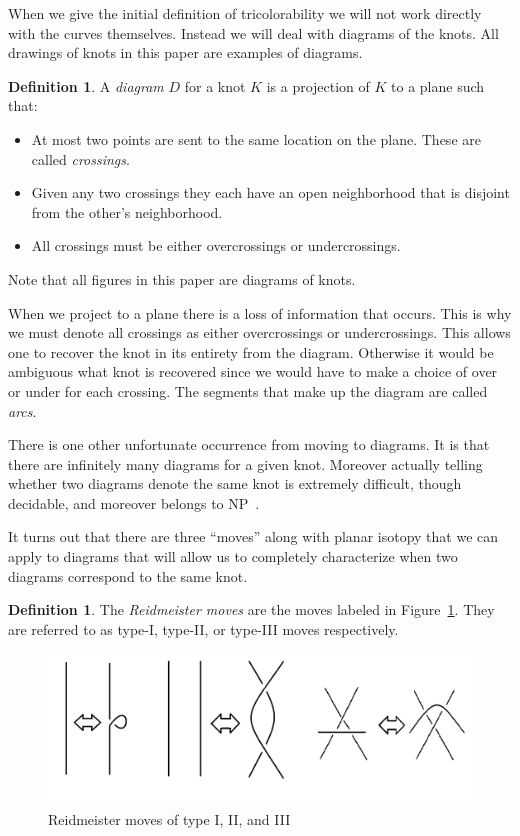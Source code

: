 \documentclass[12pt]{amsart}
\theoremstyle{definition}
\newtheorem{definition}[theorem]{Definition}
\theoremstyle{remark}
\numberwithin{equation}{section}
\newcommand{\ds}{.3}
\begin{document}
When we give the initial definition of  tricolorability we will not work
directly with the curves themselves. Instead we will deal with diagrams
of the knots. All drawings of knots in this paper are examples of diagrams.

\begin{definition}
  A \textit{diagram} $D$ for a knot $K$ is a projection of $K$ to a plane
  such that:
  \begin{itemize}
  \item At most two points are sent to the same location on the plane.
    These are called \textit{crossings}.
  \item Given any two crossings they each have an open neighborhood
    that is disjoint from the other's neighborhood.
  \item All crossings must be either overcrossings or undercrossings.
  \end{itemize}
  Note that all figures in this paper are diagrams of knots.
\end{definition}

When we project to a plane there is a loss of information that occurs. This
is why we must denote all crossings as either overcrossings or undercrossings.
This allows one to recover the knot in its entirety from the diagram. Otherwise
it would be ambiguous what knot is recovered since we would have to make a choice
of over or under for each crossing. The segments that make up the diagram
are called \textit{arcs}.

There is one other unfortunate occurrence
from moving to diagrams. It is that there are infinitely many diagrams
for a given knot. Moreover actually telling whether two diagrams denote
the same knot is extremely difficult, though decidable, and moreover
belongs to NP~\cite{Poonen}.

It turns out that there are three ``moves'' along with planar isotopy
that we can apply to diagrams that will allow us to completely characterize
when two diagrams correspond to the same knot.

\begin{definition}
  The \textit{Reidmeister moves} are the moves labeled in Figure~\ref{fig:reidmeister}.
  They are referred to as type-I, type-II, or type-III moves respectively.

  \begin{figure}
    \includegraphics[scale=\ds]{reidmeister}
    \caption{Reidmeister moves of type I, II, and III}
    \label{fig:reidmeister}
  \end{figure}
\end{definition}
\end{document}
